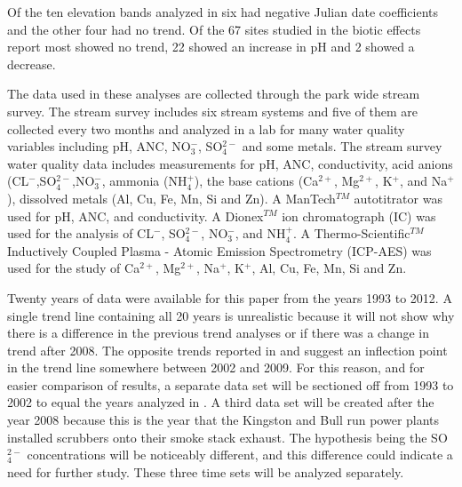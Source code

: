 Of the ten elevation bands analyzed in \citet{robinson2008ph} six had negative Julian date coefficients and the other four had no trend. Of the 67 sites studied in the biotic effects report most showed no trend, 22 showed an increase in pH and 2 showed a decrease\citep{cai2012}. 
    
The data used in these analyses are collected through the park wide stream survey. 
The stream survey includes six stream systems and five of them are collected every two months and analyzed in a lab for many water quality variables including pH, ANC, NO$_3^-$, SO$_4^{2-}$ and some metals.  %
The stream survey water quality data includes measurements for pH, ANC, conductivity, acid anions (CL$^-$,SO$_4^{2-}$,NO$_3^-$, ammonia (NH$_4^+$), the base cations (Ca$^{2+}$, Mg$^{2+}$, K$^+$, and Na$^+$), dissolved metals (Al, Cu, Fe, Mn, Si and Zn).  
A ManTech$^{TM}$ autotitrator was used for pH, ANC, and conductivity.  
A Dionex$^{TM}$ ion chromatograph (IC) was used for the analysis of CL$^-$, SO$_4^{2-}$, NO$_3^-$, and NH$_4^+$.  A Thermo-Scientific$^{TM}$ Inductively Coupled Plasma - Atomic Emission Spectrometry (ICP-AES) was used for the study of Ca$^{2+}$, Mg$^{2+}$, Na$^+$, K$^+$, Al, Cu, Fe, Mn, Si and Zn.

Twenty years of data were available for this paper from the years 1993 to 2012. 
A single trend line containing all 20 years is unrealistic because it will not show why there is a difference in the previous trend analyses or if there was a change in trend after 2008. 
The opposite trends reported in  \citet{robinson2008ph} and \citet{cai2012} suggest an inflection point in the trend line somewhere between 2002 and 2009. For this reason, and for easier comparison of results,  a separate data set will be sectioned off from 1993 to 2002 to equal the years analyzed in \citet{robinson2008ph}.  
A third data set will be created after the year 2008 because this is the year that the Kingston and Bull run power plants installed scrubbers onto their smoke stack exhaust. 
The hypothesis being the SO$_4^{2-}$ concentrations will be noticeably different, and this difference could indicate a need for further study. 
These three time sets will be analyzed separately.

